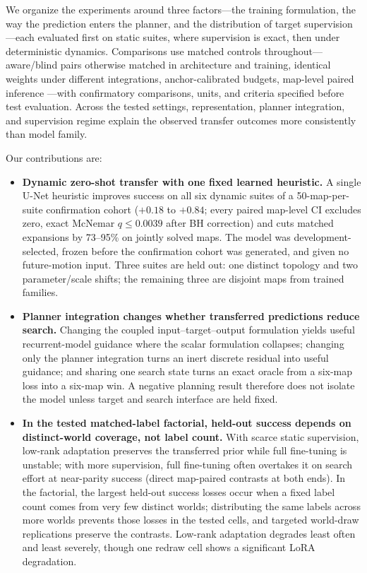 \documentclass[letterpaper]{article} %
\begin{document}
We organize the experiments around three factors---the training formulation, the way the prediction enters the planner, and the distribution of target supervision---each evaluated first on static suites, where supervision is exact, then under deterministic dynamics. Comparisons use matched controls throughout---aware/blind pairs otherwise matched in architecture and training, identical weights under different integrations, anchor-calibrated budgets, map-level paired inference \citep{henderson2018matters,agarwal2021precipice,pineau2021reproducibility}---with confirmatory comparisons, units, and criteria specified before test evaluation. Across the tested settings, representation, planner integration, and supervision regime explain the observed transfer outcomes more consistently than model family.

Our contributions are:
\begin{itemize}
    \item \textbf{Dynamic zero-shot transfer with one fixed learned heuristic.} A single U-Net heuristic improves success on all six dynamic suites of a 50-map-per-suite confirmation cohort ($+0.18$ to $+0.84$; every paired map-level CI excludes zero, exact McNemar $q \leq 0.0039$ after BH correction) and cuts matched expansions by 73--95\% on jointly solved maps. The model was development-selected, frozen before the confirmation cohort was generated, and given no future-motion input. Three suites are held out: one distinct topology and two parameter/scale shifts; the remaining three are disjoint maps from trained families.
    \item \textbf{Planner integration changes whether transferred predictions reduce search.} Changing the coupled input--target--output formulation yields useful recurrent-model guidance where the scalar formulation collapses; changing only the planner integration turns an inert discrete residual into useful guidance; and sharing one search state turns an exact oracle from a six-map loss into a six-map win. A negative planning result therefore does not isolate the model unless target and search interface are held fixed.
    \item \textbf{In the tested matched-label factorial, held-out success depends on distinct-world coverage, not label count.} With scarce static supervision, low-rank adaptation preserves the transferred prior while full fine-tuning is unstable; with more supervision, full fine-tuning often overtakes it on search effort at near-parity success (direct map-paired contrasts at both ends). In the factorial, the largest held-out success losses occur when a fixed label count comes from very few distinct worlds; distributing the same labels across more worlds prevents those losses in the tested cells, and targeted world-draw replications preserve the contrasts. Low-rank adaptation degrades least often and least severely, though one redraw cell shows a significant LoRA degradation.
\end{itemize}
\end{document}

